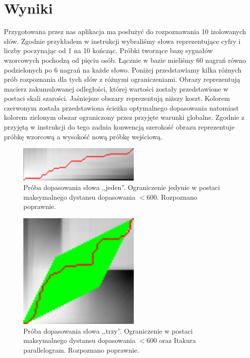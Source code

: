 \documentclass{classrep}
\begin{document}
\section{Wyniki}
Przygotowana przez nas aplikacja ma posłużyć do rozpoznawania 10 izolowanych słów. Zgodnie przykładem w instrukcji wybraliśmy słowa reprezentujące cyfry i liczby poczynając od 1 na 10 kończąc. Próbki tworzące bazę sygnałów wzorcowych pochodzą od pięciu osób. Łącznie w bazie mieliśmy 60 nagrań równo podzielonych po 6 nagrań na każde słowo. Poniżej przedstawiamy kilka różnych prób rozpoznania dla tych słów z różnymi ograniczeniami. Obrazy reprezentują macierz zakumulowanej odległości, której wartości zostały przedstawione w postaci skali szarości. Jaśniejsze obszary reprezentują niższy koszt. Kolorem czerwonym została przedstawiona ścieżka optymalnego dopasowania natomiast kolorem zielonym obszar ograniczony przez przyjęte warunki globalne. Zgodnie z przyjętą w instrukcji do tego zadnia konwencją szerokość obrazu reprezentuje próbkę wzorcową a wysokość nową próbkę wejściową.

\begin{figure}[H]
\centering
\includegraphics[width=6cm]{dtw_jeden.PNG} 
\caption{Próba dopasowania słowa ,,jeden''. Ograniczenie jedynie w postaci maksymalnego dystansu dopasowania $<600$. Rozpoznano poprawnie.}
\label{fig:dtw_jeden}
\end{figure}

\begin{figure}[H]
\centering
\includegraphics[width=6cm]{dtw_i_trzy.PNG} 
\caption{Próba dopasowania słowa ,,trzy''. Ograniczenie w postaci maksymalnego dystansu dopasowania $<600$ oraz Itakura parallelogram. Rozpoznano poprawnie.}
\label{fig:dtw_i_trzy}
\end{figure}
\end{document}
